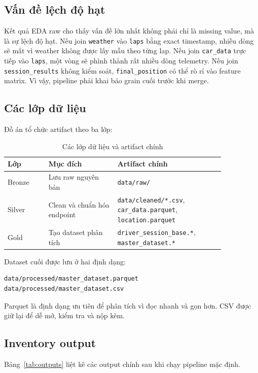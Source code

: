 \documentclass[conference]{IEEEtran}
\begin{document}
\subsection{Vấn đề lệch độ hạt}
Kết quả EDA raw cho thấy vấn đề lớn nhất không phải chỉ là missing value, mà là sự lệch độ hạt. Nếu join \texttt{weather} vào \texttt{laps} bằng exact timestamp, nhiều dòng sẽ mất vì weather không được lấy mẫu theo từng lap. Nếu join \texttt{car\_data} trực tiếp vào \texttt{laps}, một vòng sẽ phình thành rất nhiều dòng telemetry. Nếu join \texttt{session\_results} không kiểm soát, \texttt{final\_position} có thể rò rỉ vào feature matrix. Vì vậy, pipeline phải khai báo grain cuối trước khi merge.

\subsection{Các lớp dữ liệu}
Đồ án tổ chức artifact theo ba lớp:


\begin{table}[H]
\caption{Các lớp dữ liệu và artifact chính}
\centering
\begin{tabular}{p{0.16\linewidth}p{0.27\linewidth}p{0.42\linewidth}}
\toprule
Lớp & Mục đích & Artifact chính \\
\midrule
Bronze & Lưu raw nguyên bản & \texttt{data/raw/} \\
Silver & Clean và chuẩn hóa endpoint & \texttt{data/cleaned/*.csv}, \texttt{car\_data.parquet}, \texttt{location.parquet} \\
Gold & Tạo dataset phân tích & \texttt{driver\_session\_base.*}, \texttt{master\_dataset.*} \\
\bottomrule
\end{tabular}
\end{table}

Dataset cuối được lưu ở hai định dạng:

\begin{lstlisting}
data/processed/master_dataset.parquet
data/processed/master_dataset.csv
\end{lstlisting}

Parquet là định dạng ưu tiên để phân tích vì đọc nhanh và gọn hơn. CSV được giữ lại để dễ mở, kiểm tra và nộp kèm.

\subsection{Inventory output}
Bảng~\ref{tab:outputs} liệt kê các output chính sau khi chạy pipeline mặc định.
\end{document}
